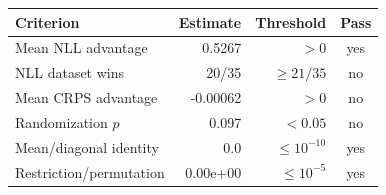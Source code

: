 \begin{tabular}{lrrc}
\toprule Criterion & Estimate & Threshold & Pass \\
\midrule
Mean NLL advantage & 0.5267 & $>0$ & yes \\ 
NLL dataset wins & 20/35 & $\geq21/35$ & no \\ 
Mean CRPS advantage & -0.00062 & $>0$ & no \\ 
Randomization $p$ & 0.097 & $<0.05$ & no \\ 
Mean/diagonal identity & 0.0 & $\leq10^{-10}$ & yes \\ 
Restriction/permutation & 0.00e+00 & $\leq10^{-5}$ & yes \\ 
\bottomrule
\end{tabular}
